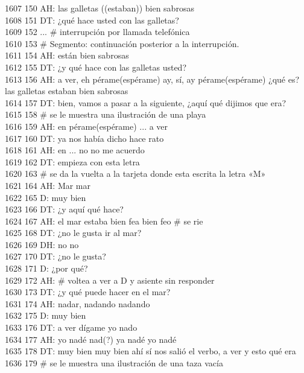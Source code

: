 1607 150 AH: las galletas ((estaban)) bien sabrosas\\
1608 151 DT: ¿qué hace usted con las galletas?\\
1609 152 ... # interrupción por llamada telefónica\\
1610 153 # Segmento: continuación posterior a la interrupción.\\
1611 154 AH: están bien sabrosas\\
1612 155 DT: ¿y qué hace con las galletas usted?\\
1613 156 AH: a ver, eh pérame(espérame) ay, sí, ay pérame(espérame) ¿qué es? las galletas estaban bien sabrosas\\
1614 157 DT: bien, vamos a pasar a la siguiente, ¿aquí qué dijimos que era?\\
1615 158 # se le muestra una ilustración de una playa\\
1616 159 AH: en pérame(espérame) ... a ver\\
1617 160 DT: ya nos había dicho hace rato\\
1618 161 AH: en ... no no me acuerdo\\
1619 162 DT: empieza con esta letra\\
1620 163 # se da la vuelta a la tarjeta donde esta escrita la letra «M»\\
1621 164 AH: Mar mar\\
1622 165 D: muy bien\\
1623 166 DT: ¿y aquí qué hace?\\
1624 167 AH: el mar estaba bien fea bien feo # se rie\\
1625 168 DT: ¿no le gusta ir al mar?\\
1626 169 DH: no no\\
1627 170 DT: ¿no le gusta?\\
1628 171 D: ¿por qué?\\
1629 172 AH: # voltea a ver a D y asiente sin responder\\
1630 173 DT: ¿y qué puede hacer en el mar?\\
1631 174 AH: nadar, nadando nadando\\
1632 175 D: muy bien\\
1633 176 DT: a ver dígame yo nado\\
1634 177 AH: yo nadé nad(?) ya nadé yo nadé\\
1635 178 DT: muy bien muy bien ahí sí nos salió el verbo, a ver y esto qué era\\
1636 179 # se le muestra una ilustración de una taza vacía\\
